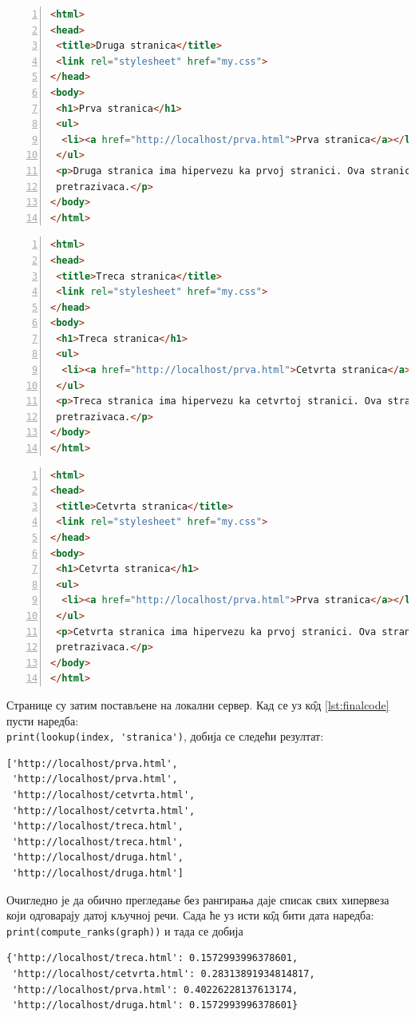 \documentclass[11pt, serbianc, english, titlepage]{article}
\begin{document}
\begin{lstlisting}[language=HTML, caption=K\^{о}д друге странице, label={lst:druga}, numbers=left]
<html>
<head>
 <title>Druga stranica</title>
 <link rel="stylesheet" href="my.css">
</head>
<body>
 <h1>Prva stranica</h1>
 <ul>
  <li><a href="http://localhost/prva.html">Prva stranica</a></li>
 </ul>
 <p>Druga stranica ima hipervezu ka prvoj stranici. Ova stranica se realizuje u cilju testiranja veb
 pretrazivaca.</p>
</body>
</html>
\end{lstlisting}%
\medskip
\pagebreak
\begin{lstlisting}[language=HTML, caption=K\^{о}д треће странице, label={lst:treca}, numbers=left]
<html>
<head>
 <title>Treca stranica</title>
 <link rel="stylesheet" href="my.css">
</head>
<body>
 <h1>Treca stranica</h1>
 <ul>
  <li><a href="http://localhost/prva.html">Cetvrta stranica</a></li>
 </ul>
 <p>Treca stranica ima hipervezu ka cetvrtoj stranici. Ova stranica se realizuje u cilju testiranja veb
 pretrazivaca.</p>
</body>
</html>
\end{lstlisting}%
\medskip
\begin{lstlisting}[language=HTML, caption=K\^{о}д четврте странице, label={lst:prva}, numbers=left]
<html>
<head>
 <title>Cetvrta stranica</title>
 <link rel="stylesheet" href="my.css">
</head>
<body>
 <h1>Cetvrta stranica</h1>
 <ul>
  <li><a href="http://localhost/prva.html">Prva stranica</a></li>
 </ul>
 <p>Cetvrta stranica ima hipervezu ka prvoj stranici. Ova stranica se realizuje u cilju testiranja veb
 pretrazivaca.</p>
</body>
</html>
\end{lstlisting}%
\medskip
Странице су затим постављене на локални сервер. Кад се уз к\^{о}д \ref{lst:finalcode} пусти наредба:\\
\lstinline{print(lookup(index, 'stranica')}, добија се следећи резултат:
\begin{lstlisting}
['http://localhost/prva.html',
 'http://localhost/prva.html',
 'http://localhost/cetvrta.html',
 'http://localhost/cetvrta.html',
 'http://localhost/treca.html',
 'http://localhost/treca.html',
 'http://localhost/druga.html',
 'http://localhost/druga.html']
\end{lstlisting}
Очигледно је да обично прегледање без рангирања даје списак свих хипервеза који одговарају датој кључној речи.
\pagebreak
Сада ће уз исти к\^{о}д бити дата наредба:\\
\lstinline{print(compute_ranks(graph))} и тада се добија
\begin{lstlisting}
{'http://localhost/treca.html': 0.1572993996378601,
 'http://localhost/cetvrta.html': 0.28313891934814817,
 'http://localhost/prva.html': 0.40226228137613174,
 'http://localhost/druga.html': 0.1572993996378601}
\end{lstlisting}
\end{document}
